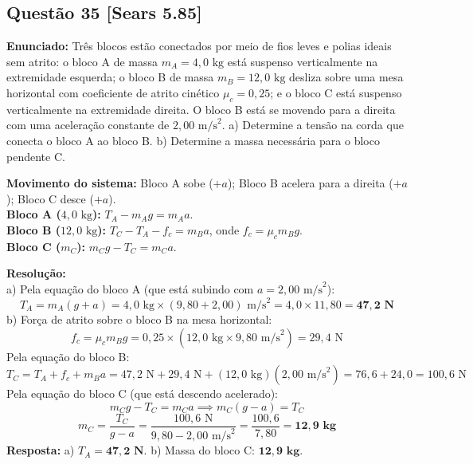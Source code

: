 \documentclass[11pt,a4paper]{article}
\begin{document}
\vspace{0.3cm}
\subsection*{Questão 35 [Sears 5.85]}
\textbf{Enunciado:} Três blocos estão conectados por meio de fios leves e polias ideais sem atrito: o bloco A de massa $m_A = 4,0\text{ kg}$ está suspenso verticalmente na extremidade esquerda; o bloco B de massa $m_B = 12,0\text{ kg}$ desliza sobre uma mesa horizontal com coeficiente de atrito cinético $\mu_c = 0,25$; e o bloco C está suspenso verticalmente na extremidade direita. O bloco B está se movendo para a direita com uma aceleração constante de $2,00\text{ m/s}^2$. a) Determine a tensão na corda que conecta o bloco A ao bloco B. b) Determine a massa necessária para o bloco pendente C.

\begin{dclbox}
\textbf{Movimento do sistema:} Bloco A sobe ($+a$); Bloco B acelera para a direita ($+a$); Bloco C desce ($+a$).\\
\textbf{Bloco A ($4,0\text{ kg}$):} $T_A - m_A g = m_A a$.\\
\textbf{Bloco B ($12,0\text{ kg}$):} $T_C - T_A - f_c = m_B a$, onde $f_c = \mu_c m_B g$.\\
\textbf{Bloco C ($m_C$):} $m_C g - T_C = m_C a$.
\end{dclbox}

\noindent
\textbf{Resolução:}\\
a) Pela equação do bloco A (que está subindo com $a = 2,00\text{ m/s}^2$):
\[ T_A = m_A(g + a) = 4,0\text{ kg} \times (9,80 + 2,00)\text{ m/s}^2 = 4,0 \times 11,80 = \mathbf{47,2\text{ N}} \]
b) Força de atrito sobre o bloco B na mesa horizontal:
\[ f_c = \mu_c m_B g = 0,25 \times (12,0\text{ kg} \times 9,80\text{ m/s}^2) = 29,4\text{ N} \]
Pela equação do bloco B:
\[ T_C = T_A + f_c + m_B a = 47,2\text{ N} + 29,4\text{ N} + (12,0\text{ kg})(2,00\text{ m/s}^2) = 76,6 + 24,0 = 100,6\text{ N} \]
Pela equação do bloco C (que está descendo acelerado):
\[ m_C g - T_C = m_C a \implies m_C (g - a) = T_C \]
\[ m_C = \frac{T_C}{g - a} = \frac{100,6\text{ N}}{9,80 - 2,00\text{ m/s}^2} = \frac{100,6}{7,80} = \mathbf{12,9\text{ kg}} \]
\textbf{Resposta:} a) $T_A = \mathbf{47,2\text{ N}}$. b) Massa do bloco C: $\mathbf{12,9\text{ kg}}$.

\vspace{0.3cm}
\end{document}
